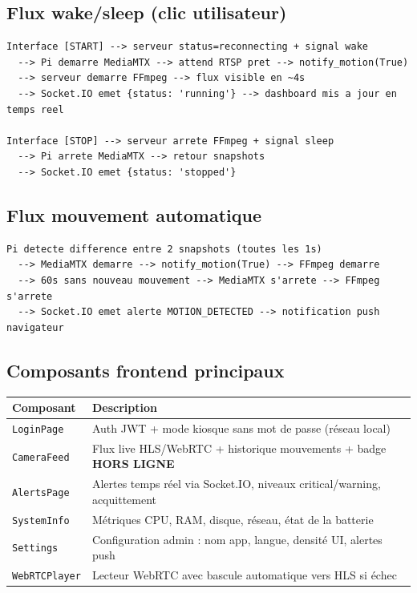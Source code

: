 \documentclass[12pt,a4paper]{article}
\begin{document}
\subsection{Flux wake/sleep (clic utilisateur)}

\begin{lstlisting}
Interface [START] --> serveur status=reconnecting + signal wake
  --> Pi demarre MediaMTX --> attend RTSP pret --> notify_motion(True)
  --> serveur demarre FFmpeg --> flux visible en ~4s
  --> Socket.IO emet {status: 'running'} --> dashboard mis a jour en temps reel

Interface [STOP] --> serveur arrete FFmpeg + signal sleep
  --> Pi arrete MediaMTX --> retour snapshots
  --> Socket.IO emet {status: 'stopped'}
\end{lstlisting}

\subsection{Flux mouvement automatique}

\begin{lstlisting}
Pi detecte difference entre 2 snapshots (toutes les 1s)
  --> MediaMTX demarre --> notify_motion(True) --> FFmpeg demarre
  --> 60s sans nouveau mouvement --> MediaMTX s'arrete --> FFmpeg s'arrete
  --> Socket.IO emet alerte MOTION_DETECTED --> notification push navigateur
\end{lstlisting}

\subsection{Composants frontend principaux}

\begin{longtable}{|l|p{10cm}|}
\hline
\textbf{Composant} & \textbf{Description} \\
\hline
\endhead
\hline
\endfoot
\texttt{LoginPage} & Auth JWT + mode kiosque sans mot de passe (réseau local) \\
\texttt{CameraFeed} & Flux live HLS/WebRTC + historique mouvements + badge \textbf{HORS LIGNE} \\
\texttt{AlertsPage} & Alertes temps réel via Socket.IO, niveaux critical/warning, acquittement \\
\texttt{SystemInfo} & Métriques CPU, RAM, disque, réseau, état de la batterie \\
\texttt{Settings} & Configuration admin : nom app, langue, densité UI, alertes push \\
\texttt{WebRTCPlayer} & Lecteur WebRTC avec bascule automatique vers HLS si échec \\
\hline
\end{longtable}
\end{document}
